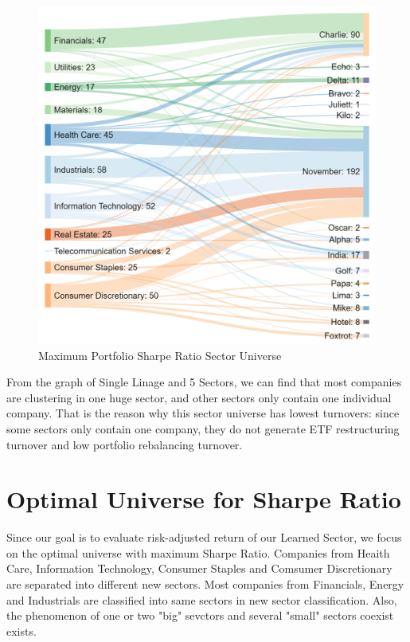 \documentclass[../main.tex]{subfiles}
\begin{document}
\begin{figure}[H]
    \centering
    \includegraphics[scale=0.2]{images/complete_2017_16.png}
    \caption{Maximum Portfolio Sharpe Ratio Sector Universe}
    \label{fig:optimal_sector_universes:max_sharpe}
\end{figure}

From the graph of Single Linage and  5 Sectors, we can find that most companies are clustering in one huge sector, and other sectors only contain one individual company. That is the reason why this sector universe has lowest turnovers: since some sectors only contain one company, they do not generate ETF restructuring turnover and low portfolio rebalancing turnover. 

\section{Optimal Universe for Sharpe Ratio}
Since our goal is to evaluate risk-adjusted return of our Learned Sector, we focus on the optimal universe with maximum Sharpe Ratio. Companies from Heaith Care, Information Technology, Consumer Staples and Comsumer Discretionary are separated into different new sectors. Most companies from Financials, Energy and Industrials are classified into same sectors in new sector classification. Also, the phenomenon of one or two "big" sevctors and several "small" sectors coexist exists. 
\end{document}
